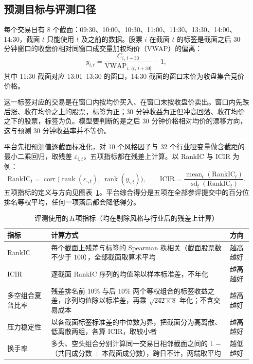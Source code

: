\documentclass[UTF8,a4paper,zihao=-4,fontset=none]{ctexart}
\newcommand{\tabsetup}{\small\linespread{1.15}\selectfont\renewcommand{\arraystretch}{1.25}}
\newcommand{\figref}[1]{图表~\ref{#1}}
\begin{document}
\subsection{预测目标与评测口径}\label{sec:label}

每个交易日有 8 个截面：09:30、10:00、10:30、11:00、11:30、13:30、14:00、14:30，截面 $t$ 只能使用 $t$ 及之前的数据。股票 $i$ 在截面 $t$ 的标签是截面之后 30 分钟窗口的收盘价相对同窗口成交量加权均价（VWAP）的偏离：
\begin{equation}\label{eq:label}
y_{i,t}=\frac{C_{i,\,t+30}}{\mathrm{VWAP}_{i,\,(t,\,t+30]}}-1 ,
\end{equation}
其中 11:30 截面对应 13:01–13:30 的窗口，14:30 截面的窗口末价为收盘集合竞价价格。

这一标签对应的交易是在窗口内按均价买入、在窗口末按收盘价卖出。窗口内先跌后涨、收在均价之上的股票，标签为正；30 分钟收益为正但冲高回落、收在均价之下的股票，标签为负。模型要判断的是之后 30 分钟价格相对均价的漂移方向，这与预测 30 分钟收益率并不等价。

平台先把预测值逐截面标准化，对 10 个风格因子与 32 个行业哑变量做含截距的最小二乘回归，取残差 $\varepsilon_{i,t}$，五项指标都在残差上计算。以 RankIC 与 ICIR 为例：
\begin{equation}\label{eq:ic}
\mathrm{RankIC}_t=\operatorname{corr}\big(\operatorname{rank}(\varepsilon_{\cdot,t}),\ \operatorname{rank}(y_{\cdot,t})\big),\qquad
\mathrm{ICIR}=\frac{\operatorname{mean}_t(\mathrm{RankIC}_t)}{\operatorname{sd}_t(\mathrm{RankIC}_t)} .
\end{equation}
五项指标的定义与方向见\figref{tab:metrics}。平台综合得分是五项在全部参评提交中的百分位排名等权平均，任何一项落后都会降低得分。

\begin{table}[htbp]
\caption{评测使用的五项指标（均在剔除风格与行业后的残差上计算）}\label{tab:metrics}
\centering\tabsetup
\begin{tabularx}{\textwidth}{@{}p{6.2em}Xp{4.2em}@{}}
\toprule
指标 & 计算方式 & 方向\\
\midrule
RankIC & 每个截面上残差与标签的 Spearman 秩相关（截面股票数不少于 100），全部截面取算术平均 & 越高越好\\
ICIR & 逐截面 RankIC 序列的均值除以样本标准差，不年化 & 越高越好\\
多空组合夏普比率 & 残差排名前 10\% 与后 10\% 两个等权组合的标签收益之差，序列均值除以标准差，再乘 $\sqrt{242\times 8}$ 年化；不含交易成本 & 越高越好\\
压力稳定性 & 以各截面标签标准差的中位数为界，把截面分为高离散、低离散两组，各算 ICIR，取较小者 & 越高越好\\
换手率 & 多头、空头组合分别计算同一交易日相邻截面之间的 1 −（共同成分数 ÷ 本截面成分数），跨日不计，两端取平均 & 越低越好\\
\bottomrule
\end{tabularx}
\end{table}
\end{document}
